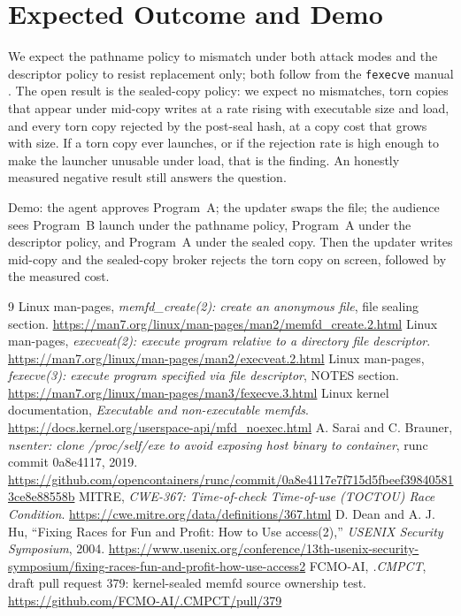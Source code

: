 \documentclass[11pt,a4paper]{article}
\begin{document}
\section{Expected Outcome and Demo}
We expect the pathname policy to mismatch under both attack modes and the descriptor policy to resist replacement only; both follow from the \texttt{fexecve} manual \cite{fexecve}. The open result is the sealed-copy policy: we expect no mismatches, torn copies that appear under mid-copy writes at a rate rising with executable size and load, and every torn copy rejected by the post-seal hash, at a copy cost that grows with size. If a torn copy ever launches, or if the rejection rate is high enough to make the launcher unusable under load, that is the finding. An honestly measured negative result still answers the question.

Demo: the agent approves Program~A; the updater swaps the file; the audience sees Program~B launch under the pathname policy, Program~A under the descriptor policy, and Program~A under the sealed copy. Then the updater writes mid-copy and the sealed-copy broker rejects the torn copy on screen, followed by the measured cost.

\begin{thebibliography}{9}
\small
{} Linux man-pages, \textit{memfd\_create(2): create an anonymous file}, file sealing section. \url{https://man7.org/linux/man-pages/man2/memfd_create.2.html}
 Linux man-pages, \textit{execveat(2): execute program relative to a directory file descriptor}. \url{https://man7.org/linux/man-pages/man2/execveat.2.html}
 Linux man-pages, \textit{fexecve(3): execute program specified via file descriptor}, NOTES section. \url{https://man7.org/linux/man-pages/man3/fexecve.3.html}
 Linux kernel documentation, \textit{Executable and non-executable memfds}. \url{https://docs.kernel.org/userspace-api/mfd_noexec.html}
 A. Sarai and C. Brauner, \textit{nsenter: clone /proc/self/exe to avoid exposing host binary to container}, runc commit 0a8e4117, 2019. \url{https://github.com/opencontainers/runc/commit/0a8e4117e7f715d5fbeef398405813ce8e88558b}
 MITRE, \textit{CWE-367: Time-of-check Time-of-use (TOCTOU) Race Condition}. \url{https://cwe.mitre.org/data/definitions/367.html}
 D. Dean and A. J. Hu, ``Fixing Races for Fun and Profit: How to Use access(2),'' \textit{USENIX Security Symposium}, 2004. \url{https://www.usenix.org/conference/13th-usenix-security-symposium/fixing-races-fun-and-profit-how-use-access2}
 FCMO-AI, \textit{.CMPCT}, draft pull request 379: kernel-sealed memfd source ownership test. \url{https://github.com/FCMO-AI/.CMPCT/pull/379}
\end{thebibliography}
\end{document}
